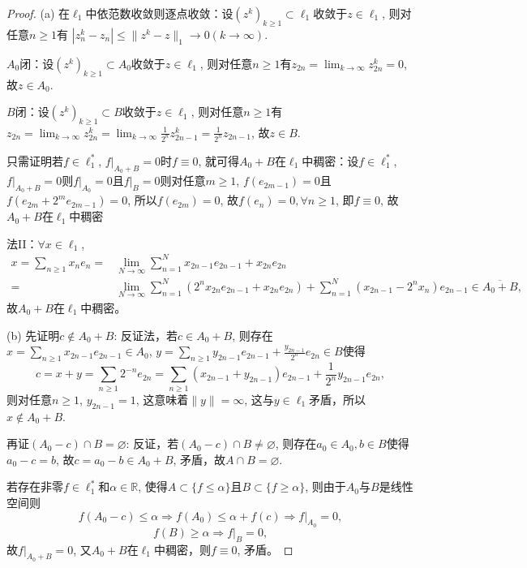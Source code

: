 \documentclass[a4paper,8pt]{ctexart}\textwidth 140mm \textheight 216mm
\newcommand{\8}{\infty}
\newcommand{\RA}{\Rightarrow}
\begin{document}
\begin{proof}
	(a) 在$\ell_1$中依范数收敛则逐点收敛：设$(z^k)_{k\geq 1}\subset \ell_1$收敛于$z\in \ell_1$, 则对任意$n\geq 1$有
	$|z_n^k-z_n|\leq\|z^k-z\|_1\to 0(k\to\infty).$
	
	$A_0$闭：设$(z^k)_{k\geq 1}\subset A_0$收敛于$z\in \ell_1$, 则对任意$n\geq 1$有$z_{2n}=\lim_{k\to\infty} z_{2n}^k=0$, 故$z\in A_0$.
	
	$B$闭：设$(z^k)_{k\geq 1}\subset B$收敛于$z\in \ell_1$, 则对任意$n\geq 1$有$z_{2n}=\lim_{k\to\infty} z_{2n}^k=\lim_{k\to\infty}\frac{1}{2^n}z_{2n-1}^k=\frac{1}{2^n}z_{2n-1}$, 故$z\in B$.
	
	只需证明若$f\in\ell_1^*$, $f|_{A_0+B}=0$时$f \equiv 0$, 就可得$A_0+B$在$\ell_1$中稠密：设$f\in\ell_1^*$, $f|_{A_0+B}=0$则$f|_{A_0}=0$且$f|_{B}=0$则对任意$m\geq 1$, $f(e_{2m-1})=0$且$f(e_{2m}+2^me_{2m-1})=0$, 所以$f(e_{2m})=0$, 故$f(e_n)=0,\forall n\geq 1$, 即$f\equiv 0$, 故$A_0+B$在$\ell_1$中稠密
	
	法II：$\forall x\in\ell_1$, 
	\[\begin{split}
	x=\sum_{n\geq 1}x_ne_n=&\lim_{N\to\infty}\sum_{n=1}^Nx_{2n-1}e_{2n-1}+x_{2n}e_{2n}\\
	=&\lim_{N\to\infty}\sum_{n=1}^N(2^nx_{2n}e_{2n-1}+x_{2n}e_{2n})+\sum_{n=1}^N(x_{2n-1}-2^nx_n)e_{2n-1}\in \overline{A_0+B},
	\end{split}\]
	故$A_0+B$在$\ell_1$中稠密。
	
	(b) 先证明$c\notin A_0+B$: 反证法，若$c\in A_0+B$, 则存在$x=\sum_{n\geq 1}x_{2n-1}e_{2n-1}\in A_0$, $y=\sum_{n\geq 1}y_{2n-1}e_{2n-1}+\frac{y_{2n-1}}{2^n}e_{2n}\in B$使得
	\[c=x+y=\sum_{n\geq 1}2^{-n}e_{2n}=\sum_{n\geq 1}(x_{2n-1}+y_{2n-1})e_{2n-1}+\frac{1}{2^n}y_{2n-1}e_{2n},\]
	则对任意$n\geq 1$, $y_{2n-1}=1$, 这意味着$\|y\|=\infty$, 这与$y\in\ell_1$矛盾，所以$x\notin A_0+B$.
	
	再证$(A_0-c)\cap B=\varnothing$: 反证，若$(A_0-c)\cap B\ne\varnothing$, 则存在$a_0\in A_0,b\in B$使得$a_0-c=b$, 故$c=a_0-b\in A_0+B$, 矛盾，故$A\cap B=\varnothing$.
	
	若存在非零$f\in\ell_1^*$和$\alpha\in\mathbb{R}$, 使得$A\subset \{f\leq\alpha\}$且$B\subset\{f\geq \alpha\}$, 则由于$A_0$与$B$是线性空间则
	\[f(A_0-c)\leq\alpha\RA f(A_0)\leq\alpha+f(c)\RA f|_{A_0}=0,\]
	\[f(B)\geq \alpha\RA f|_{B}=0,\]
	故$f|_{A_0+B}=0$, 又$A_0+B$在$\ell_1$中稠密，则$f\equiv0$, 矛盾。
\end{proof}
\end{document}
